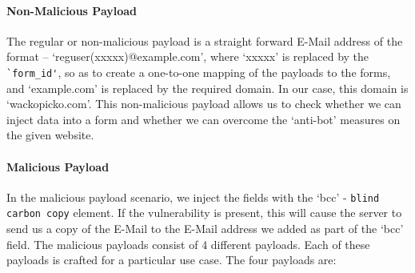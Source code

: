 \paragraph{Non-Malicious Payload}
\label{Comp:Fuzzer:nmp}
The regular or non-malicious payload is a straight forward E-Mail address of the format -- `reguser(xxxxx)@example.com', where `xxxxx' is replaced by the \lstinline{`form_id'}, so as to create a one-to-one mapping of the payloads to the forms, and `example.com' is replaced by the required domain. In our case, this domain is `wackopicko.com'.
This non-malicious payload allows us to check whether we can inject data into a form and whether we can overcome the `anti-bot' measures on the given website.

\paragraph{Malicious Payload}
\label{Comp:Fuzzer:mp}
In the malicious payload scenario, we inject the fields with the `bcc' - \lstinline{blind carbon copy} element. If the vulnerability is present, this will cause the server to send us a copy of the E-Mail to the E-Mail address we added as part of the `bcc' field.
The malicious payloads consist of 4 different payloads. Each of these payloads is crafted for a particular use case. The four payloads are:
